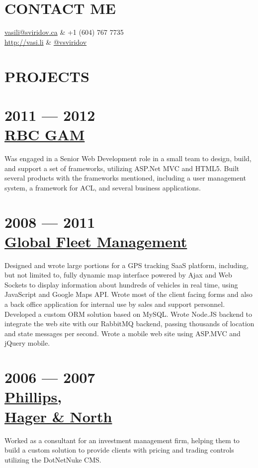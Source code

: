 \documentclass[margin]{res}
\begin{document}
  

\address{ \#304 - 6742 Station Hill Ct \\ Burnaby, BC, V3N4V2\\Canada }
                        
\begin{resume}

\section{CONTACT ME}
	\begin{ncolumn}{2}
		\href{mailto:vasili@sviridov.ca}{vasili@sviridov.ca} & +1 (604) 767 7735 \\
		\href{http://vasi.li}{http://vasi.li} & \href{http://twitter.com/vsviridov}{@vsviridov}
	\end{ncolumn}
 
\section{PROJECTS}
	\section{2011 --- 2012\\\href{http://www.rbcgam.com/gam/}{RBC GAM}}
	Was engaged in a Senior Web Development role in a small team to design, build, and support a set of frameworks, utilizing ASP.Net MVC and HTML5. Built several products with the frameworks mentioned, including a user management system, a framework for ACL, and several business applications.
	\section{2008 --- 2011\\\href{http://positrace.com}{Global Fleet Management}}
	 Designed and wrote large portions for a GPS tracking SaaS platform, including, but not limited to, fully dynamic map interface powered by Ajax and Web Sockets to display information about hundreds of vehicles in real time, using JavaScript and Google Maps API. Wrote most of the client facing forms and also a back office application for internal use by sales and support personnel. Developed a custom ORM solution based on MySQL. Wrote Node.JS backend to integrate the web site with our RabbitMQ backend, passing thousands of location and state messages per second. Wrote a mobile web site using ASP.MVC and jQuery mobile.
	\section{2006 --- 2007\\\href{https://wwwphn.com/}{Phillips,\\Hager \& North}}
	Worked as a consultant for an investment management firm, helping them to build a custom solution to provide clients with pricing and trading controls utilizing the DotNetNuke CMS.

\end{resume}
\end{document}

